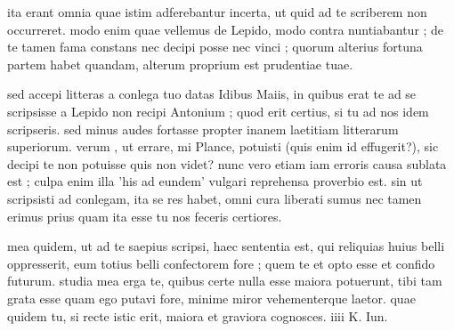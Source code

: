 


 ita erant omnia quae istim adferebantur incerta, ut quid ad te scriberem non occurreret. modo enim quae vellemus de Lepido, modo contra nuntiabantur ; de te tamen fama constans nec decipi posse nec vinci ; quorum alterius fortuna partem habet quandam, alterum proprium est prudentiae tuae.

 sed accepi litteras a conlega tuo datas Idibus Maiis, in quibus erat te ad se scripsisse a Lepido non recipi Antonium ; quod erit certius, si tu ad nos idem scripseris. sed minus audes fortasse propter inanem laetitiam litterarum superiorum. verum , ut errare, mi Plance, potuisti (quis enim id effugerit?), sic decipi te non potuisse quis non videt? nunc vero etiam iam erroris causa sublata est ; culpa enim illa 'his ad eundem' vulgari reprehensa proverbio est. sin ut scripsisti ad conlegam, ita se res habet, omni cura liberati sumus nec tamen erimus prius quam ita esse tu nos feceris certiores.

 mea quidem, ut ad te saepius scripsi, haec sententia est, qui reliquias huius belli oppresserit, eum totius belli confectorem fore ; quem te et opto esse et confido futurum. studia mea erga te, quibus certe nulla esse maiora potuerunt, tibi tam grata esse quam ego putavi fore, minime miror vehementerque laetor. quae quidem tu, si recte istic erit, maiora et graviora cognosces. iiii K. Iun.
